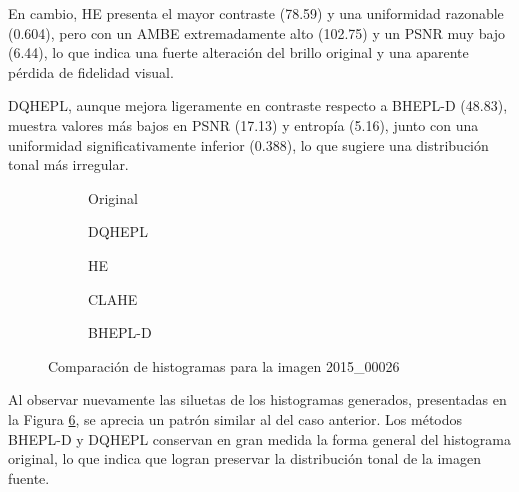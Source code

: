 \documentclass[sigchi]{acmart}
\begin{document}
En cambio, HE presenta el mayor contraste (78.59) y una uniformidad razonable (0.604), pero con
un AMBE extremadamente alto (102.75) y un PSNR muy bajo (6.44), lo que indica una fuerte
alteración del brillo original y una aparente pérdida de fidelidad visual.

DQHEPL, aunque mejora ligeramente en contraste respecto a BHEPL-D (48.83), muestra valores más
bajos en PSNR (17.13) y entropía (5.16), junto con una uniformidad significativamente inferior
(0.388), lo que sugiere una distribución tonal más irregular.

\begin{figure}[htbp]
	\centering
	\begin{subfigure}[b]{0.45\textwidth}
		\resizebox{\linewidth}{!}{}
		\caption{Original}
		\label{fig:original_2}
	\end{subfigure}
	\hfill
	\begin{subfigure}[b]{0.45\textwidth}
		\resizebox{\linewidth}{!}{}
		\caption{DQHEPL}
		\label{fig:dqhepl_2}
	\end{subfigure}

	\begin{subfigure}[b]{0.45\textwidth}
		\resizebox{\linewidth}{!}{}
		\caption{HE}
		\label{fig:he_2}
	\end{subfigure}
	\hfill
	\begin{subfigure}[b]{0.45\textwidth}
		\resizebox{\linewidth}{!}{}
		\caption{CLAHE}
		\label{fig:clahe_2}
	\end{subfigure}

	\centering
	\begin{subfigure}[b]{0.45\textwidth}
		\resizebox{\linewidth}{!}{}
		\caption{BHEPL-D}
		\label{fig:bhepl_2}
	\end{subfigure}

	\caption{Comparación de histogramas para la imagen 2015\_00026}
	\label{fig:histogramas_2}
\end{figure}

Al observar nuevamente las siluetas de los histogramas generados, presentadas en la Figura
\ref{fig:histogramas_2}, se aprecia un patrón similar al del caso anterior. Los métodos BHEPL-D
y DQHEPL conservan en gran medida la forma general del histograma original, lo que indica que
logran preservar la distribución tonal de la imagen fuente.
\end{document}
